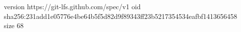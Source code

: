 version https://git-lfs.github.com/spec/v1
oid sha256:231add1e05776e4be64b5f5d82d9f89343ff23b5217354534eafbf1413656458
size 68
